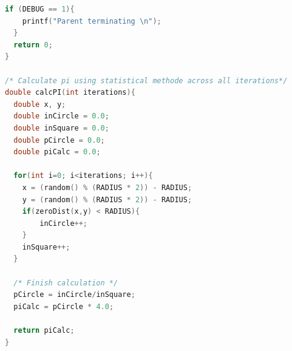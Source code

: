\documentclass{article}
\begin{document}
\begin{lstlisting}[language=c]
  if (DEBUG == 1){
    printf("Parent terminating \n");
  }
  return 0;
}

/* Calculate pi using statistical methode across all iterations*/
double calcPI(int iterations){
  double x, y;
  double inCircle = 0.0;
  double inSquare = 0.0;
  double pCircle = 0.0;
  double piCalc = 0.0;

  for(int i=0; i<iterations; i++){
  	x = (random() % (RADIUS * 2)) - RADIUS;
  	y = (random() % (RADIUS * 2)) - RADIUS;
  	if(zeroDist(x,y) < RADIUS){
  	    inCircle++;
  	}
  	inSquare++;
  }

  /* Finish calculation */
  pCircle = inCircle/inSquare;
  piCalc = pCircle * 4.0;

  return piCalc;
}

\end{lstlisting}
\end{document}
